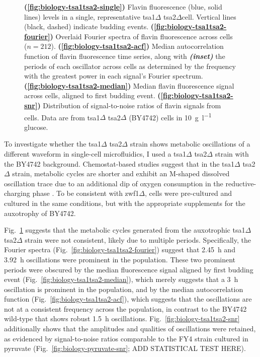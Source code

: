 \begin{figure}
  \caption{
    \textbf{(\ref{fig:biology-tsa1tsa2-single})}
    Flavin fluorescence (blue, solid lines) levels in a single, representative tsa1$\Delta$ tsa2$\Delta$cell.
    Vertical lines (black, dashed) indicate budding events.
    \textbf{(\ref{fig:biology-tsa1tsa2-fourier})}
    Overlaid Fourier spectra of flavin fluorescence across cells ($n=212$).
    \textbf{(\ref{fig:biology-tsa1tsa2-acf})}
    Median autocorrelation function of flavin fluorescence time series, along with \textit{\textbf{(inset)}} the periods of each oscillator across cells as determined by the frequency with the greatest power in each signal's Fourier spectrum.
    \textbf{(\ref{fig:biology-tsa1tsa2-median})}
    Median flavin fluorescence signal across cells, aligned to first budding event.
    \textbf{(\ref{fig:biology-tsa1tsa2-snr})}
    Distribution of signal-to-noise ratios of flavin signals from cells.
    Data are from tsa1$\Delta$ tsa2$\Delta$ (BY4742) cells in \SI{10}{\gram~\litre^{-1}} glucose.
  }
  \label{fig:biology-tsa1tsa2}
\end{figure}


To investigate whether the tsa1$\Delta$ tsa2$\Delta$ strain shows metabolic oscillations of a different waveform in single-cell microfluidics, I used a tsa1$\Delta$ tsa2$\Delta$ strain with the BY4742 background.
Chemostat-based studies suggest that in the tsa1$\Delta$ tsa2$\Delta$ strain, metabolic cycles are shorter and exhibit an M-shaped dissolved oscillation trace due to an additional dip of oxygen consumption in the reductive-charging phase \parencite{caustonMetabolicCyclesYeast2015}.
To be consistent with zwf1$\Delta$, cells were pre-cultured and cultured in the same conditions, but with the appropriate supplements for the auxotrophy of BY4742.
%

Fig.\ \ref{fig:biology-tsa1tsa2} suggests that the metabolic cycles generated from the auxotrophic tsa1$\Delta$ tsa2$\Delta$ strain were not consistent, likely due to multiple periods.
Specifically, the Fourier spectra (Fig.\ \ref{fig:biology-tsa1tsa2-fourier}) suggest that \SI{2.45}{\hour} and \SI{3.92}{\hour} oscillations were prominent in the population.
These two prominent periods were obscured by the median fluorescence signal aligned by first budding event (Fig.\ \ref{fig:biology-tsa1tsa2-median}), which merely suggests that a \SI{3}{\hour} oscillation is prominent in the population, and by the median autocorrelation function (Fig.\ \ref{fig:biology-tsa1tsa2-acf}), which suggests that the oscillations are not at a consistent frequency across the population, in contrast to the BY4742 wild-type that shows robust \SI{1.5}{\hour} oscillations.
Fig.\ \ref{fig:biology-tsa1tsa2-snr} additionally shows that the amplitudes and qualities of oscillations were retained, as evidenced by signal-to-noise ratios comparable to the FY4 strain cultured in pyruvate (Fig.\ \ref{fig:biology-pyruvate-snr}; ADD STATISTICAL TEST HERE).

